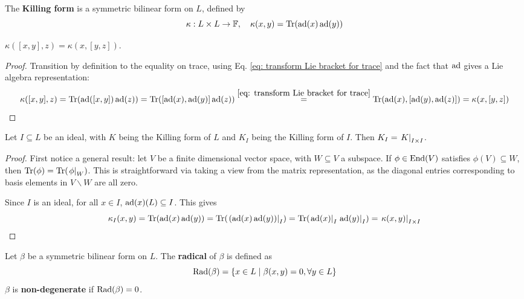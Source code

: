 \documentclass{article}
\begin{document}
\begin{definition}
    The \textbf{Killing form} is a symmetric bilinear form on $L$, defined by
    \[
        \kappa: L \times L \to \mathbb{F}, \quad \kappa(x, y) = \operatorname{Tr}(\operatorname{ad}(x) \operatorname{ad}(y))
    \]
\end{definition}

\begin{lemma}\label{lem: transition of bracket in Killing form}
    $\kappa([x, y], z) = \kappa(x, [y, z])$.
\end{lemma}

\begin{proof}
    Transition by definition to the equality on trace, using Eq. \eqref{eq: transform Lie bracket for trace} and the fact that $\operatorname{ad}$ gives a Lie algebra representation:
    \[
        \kappa([x, y], z)
        = \operatorname{Tr}(\operatorname{ad}([x, y])\operatorname{ad}(z)) = \operatorname{Tr}([\operatorname{ad}(x), \operatorname{ad}(y)]\operatorname{ad}(z)) \overset{\eqref{eq: transform Lie bracket for trace}}{=} \operatorname{Tr}(\operatorname{ad}(x), [\operatorname{ad}(y), \operatorname{ad}(z)]) = \kappa(x, [y, z])
    \]
\end{proof}

\begin{lemma}\label{lem: restricting Killing form on ideal}
    Let $I \subseteq L$ be an ideal, with $K$ being the Killing form of $L$ and $K_I$ being the Killing form of $I$. Then $K_I = \left.K\right|_{I \times I}$.
\end{lemma}

\begin{proof}
    First notice a general result: let $V$ be a finite dimensional vector space, with $W \subseteq V$ a subspace. If $\phi \in \mathrm{End}(V)$ satisfies $\phi(V) \subseteq W$, then $\operatorname{Tr}(\phi) = \operatorname{Tr}(\left.\phi\right|_{W})$. This is straightforward via taking a view from the matrix representation, as the diagonal entries corresponding to basis elements in $V \smallsetminus W$ are all zero.

    Since $I$ is an ideal, for all $x \in I$, $\operatorname{ad}(x)(L) \subseteq I$. This gives
    \[
        \kappa_I(x, y) = \operatorname{Tr}(\operatorname{ad}(x) \operatorname{ad}(y)) = \operatorname{Tr}( \left.(\operatorname{ad}(x) \operatorname{ad}(y))\right|_{I} ) = \operatorname{Tr}(\left.\operatorname{ad}(x)\right|_{I} \left.\operatorname{ad}(y)\right|_{I}) = \left.\kappa(x, y)\right|_{I \times I}
    \]
\end{proof}

\begin{definition}
    Let $\beta$ be a symmetric bilinear form on $L$. The \textbf{radical} of $\beta$ is defined as
    \[
        \operatorname{Rad}(\beta) = \{ x \in L \mid \beta(x, y) = 0, \forall y \in L \}
    \]
    $\beta$ is \textbf{non-degenerate} if $\operatorname{Rad}(\beta) = 0$.
\end{definition}
\end{document}

